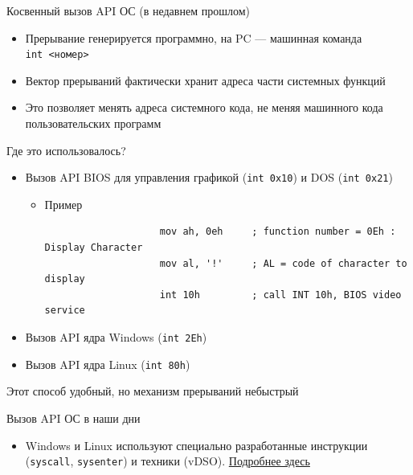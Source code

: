 \documentclass[xetex,aspectratio=43]{beamer}
\begin{document}
\begin{frame}[fragile]{Косвенный вызов API ОС (в недавнем прошлом)}
	\begin{itemize}
		\tightlist
		\item
		Прерывание генерируется программно, на PC --- машинная команда
		\texttt{int\ \textless{}номер\textgreater{}}
		\item
		Вектор прерываний фактически хранит адреса части системных функций
		\item
		Это позволяет менять адреса системного кода, не меняя машинного кода
		пользовательских программ
	\end{itemize}
	
	\begin{block}{Где это использовалось?}
		\begin{itemize}
			\tightlist
			\item
			Вызов API BIOS для управления графикой (\texttt{int\ 0x10}) и DOS
			(\texttt{int\ 0x21})
			
			\begin{itemize}
				\tightlist
				\item
				Пример
		
				\begin{verbatim}
                    mov ah, 0eh     ; function number = 0Eh : Display Character
                    mov al, '!'     ; AL = code of character to display
                    int 10h         ; call INT 10h, BIOS video service
				\end{verbatim}
			\end{itemize}
		\end{itemize}
		
		\begin{itemize}
			\tightlist
			\item
			Вызов API ядра Windows (\texttt{int 2Eh})
			\item
			Вызов API ядра Linux (\texttt{int 80h})
		\end{itemize}
		
		Этот способ удобный, но механизм прерываний небыстрый
		
		\pause
	\end{block}
\end{frame}

\begin{frame}{Вызов API ОС в наши дни}
	\begin{itemize}
		\item
		Windows и Linux используют специально разработанные инструкции
		(\texttt{syscall}, \texttt{sysenter}) и техники (vDSO). \href{https://habr.com/ru/post/347596/}{Подробнее здесь \extlink}
	\end{itemize}
\end{frame}
\end{document}
